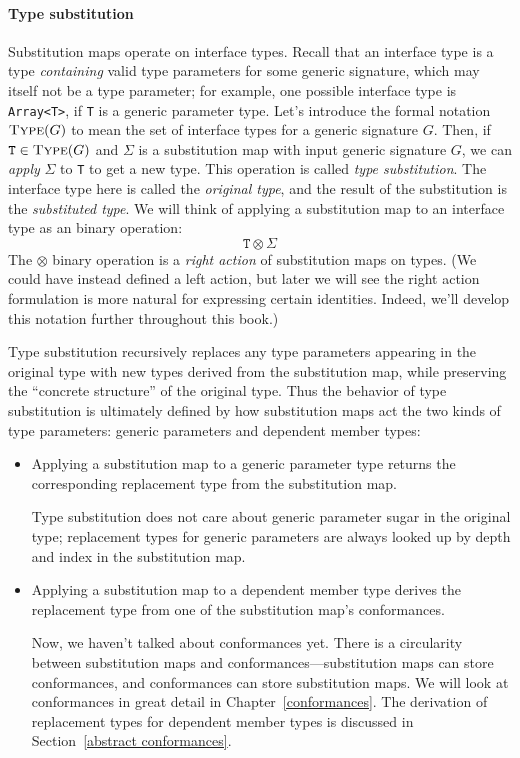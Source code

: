 \documentclass[../generics]{subfiles}
\begin{document}
\paragraph{Type substitution} Substitution maps operate on interface types. Recall that an interface type is a type \emph{containing} valid type parameters for some generic signature, which may itself not be a type parameter; for example, one possible interface type is \texttt{Array<T>}, if \texttt{T} is a generic parameter type. Let's introduce the formal notation $\textsc{Type}({G})$ to mean the set of interface types for a generic signature $G$. Then, if $\texttt{T}\in\textsc{Type}({G})$ and $\Sigma$ is a substitution map with input generic signature $G$, we can \emph{apply} $\Sigma$ to \texttt{T} to get a new type. This operation is called \emph{type substitution}. The interface type here is called the \emph{original type}, and the result of the substitution is the \emph{substituted type}. We will think of applying a substitution map to an interface type as an binary operation: \[\texttt{T}\otimes\Sigma\]
The \index{$\otimes$}$\otimes$ binary operation is a \emph{right action} of substitution maps on types. (We could have instead defined a left action, but later we will see the right action formulation is more natural for expressing certain identities. Indeed, we'll develop this notation further throughout this book.)

Type substitution recursively replaces any type parameters appearing in the original type with new types derived from the substitution map, while preserving the ``concrete structure'' of the original type. Thus the behavior of type substitution is ultimately defined by how substitution maps act the two kinds of type parameters: generic parameters and dependent member types:
\begin{itemize}
\item Applying a substitution map to a generic parameter type returns the corresponding replacement type from the substitution map.

Type substitution does not care about generic parameter sugar in the original type; replacement types for generic parameters are always looked up by depth and index in the substitution map.

\item Applying a substitution map to a dependent member type derives the replacement type from one of the substitution map's conformances.

Now, we haven't talked about conformances yet. There is a circularity between substitution maps and conformances---substitution maps can store conformances, and conformances can store substitution maps. We will look at conformances in great detail in Chapter~\ref{conformances}. The derivation of replacement types for dependent member types is discussed in Section~\ref{abstract conformances}.
\end{itemize}
\end{document}
